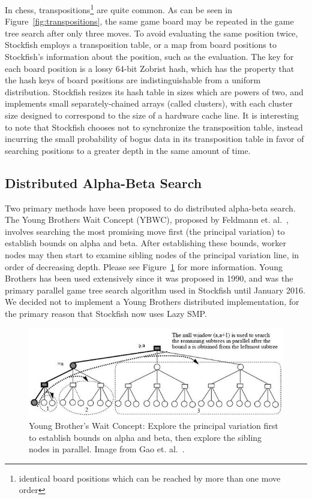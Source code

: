 \documentclass{article}
\begin{document}
In chess, transpositions\footnote{identical board positions which can
be reached by more than one move order} are quite common.
As can be seen in Figure~\ref{fig:transpositions}, the same game board may be
repeated in the game tree search after only three moves.
To avoid evaluating the same position
twice, Stockfish employs a transposition table, or a map from board positions to
Stockfish's information about the position, such as the evaluation. The key for each board position is a lossy 64-bit
Zobrist hash\cite{Zobrist}, which has the property that the hash keys of board
positions are 
indistinguishable from a uniform distribution. Stockfish resizes its hash table
in sizes which are powers of two, and implements small separately-chained arrays
(called clusters), with each cluster size designed to correspond to the size of a hardware
cache line.
It is interesting to note that Stockfish chooses not to synchronize the
transposition table, instead incurring
the small probability of bogus data in its transposition table in favor of
searching positions to a greater depth in the same amount of time.

\subsection{Distributed Alpha-Beta Search}
Two primary methods have been proposed to do distributed alpha-beta search. The
Young Brothers Wait Concept (YBWC), proposed by Feldmann et.
al.~\cite{YBWC:article}, involves searching the most
promising move first (the principal variation) to establish bounds on alpha and
beta. After establishing these bounds, worker nodes may then start to examine sibling
nodes of the principal variation line, in order of decreasing depth.
Please see Figure~\ref{fig:YBWC} for more information. Young Brothers has been used
extensively since it was proposed in 1990, and was the primary parallel game tree search algorithm used in
Stockfish until January 2016. We decided not to implement a Young Brothers
distributed implementation, for the primary reason that Stockfish now uses Lazy
SMP.

\begin{figure}[t]
	\includegraphics[width=\textwidth]{PVSplit}
	\caption{Young Brother's Wait Concept: Explore the principal variation
	first to establish bounds on alpha and beta, then explore the sibling
	nodes in parallel. Image from Gao et. al.~\cite{PVSplit:article}.}
	\label{fig:YBWC}
\end{figure}
\end{document}
